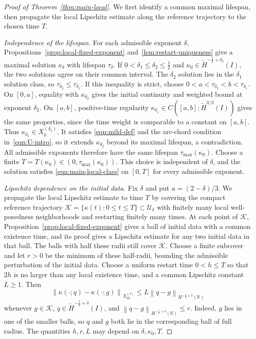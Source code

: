 \documentclass[11pt,reqno]{amsart}
\theoremstyle{plain}
\theoremstyle{definition}
\numberwithin{equation}{section}
\newcommand{\mc}[1]{\mathcal{#1}}
\newcommand{\wt}[1]{\widetilde{#1}}
\newcommand{\norm}[1]{\left\lVert #1 \right\rVert}
\newcommand{\R}{\mathbb{R}}
\newcommand{\thi}[1]{\wt H^{#1}(I)}
\newcommand{\hr}[1]{H^{#1}(\R)}
\begin{document}
\begin{proof}[Proof of Theorem~\ref{thm:main-local}]
We first identify a common maximal lifespan, then propagate the local
Lipschitz estimate along the reference trajectory to the chosen time $T$.

\emph{Independence of the lifespan.}
For each admissible exponent $\delta$,
Propositions~\ref{prop:local-fixed-exponent} and~\ref{lem:restart-uniqueness}
give a maximal solution $\kappa_\delta$ with lifespan $\tau_\delta$.
If $0<\delta_1\le\delta_2\le\frac12$ and
$\kappa_0\in\thi{-\frac12+\delta_2}$, the two solutions agree on their
common interval. The $\delta_2$ solution lies in the
$\delta_1$ solution class, so $\tau_{\delta_2}\le\tau_{\delta_1}$.
If this inequality is strict, choose
$0<a<\tau_{\delta_2}<b<\tau_{\delta_1}$.
On $[0,a]$, equality with $\kappa_{\delta_2}$ gives the initial continuity
and weighted bound at exponent $\delta_2$. On $[a,b]$, positive-time
regularity $\kappa_{\delta_1}\in C([a,b];\thi{3/2})$ gives the same
properties, since the time weight is comparable to a constant on $[a,b]$.
Thus $\kappa_{\delta_1}\in X_b^{(\delta_2)}$. It satisfies
\eqref{eqn:mild-def} and the arc-chord condition in~\eqref{eqn:U-intro},
so it extends $\kappa_{\delta_2}$ beyond its maximal lifespan, a
contradiction. All admissible exponents therefore have the
same lifespan $\tau_{\mathrm{max}}(\kappa_0)$.
Choose a finite $T=T(\kappa_0)\in(0,\tau_{\mathrm{max}}(\kappa_0))$.
This choice is independent of $\delta$, and the solution satisfies
\eqref{eqn:main-local-class} on $[0,T]$ for every admissible exponent.

\emph{Lipschitz dependence on the initial data.}
Fix $\delta$ and put $a=(2-\delta)/3$. We propagate the local Lipschitz
estimate to time $T$ by covering the compact reference trajectory
$\mc K=\{\kappa(t):0\le t\le T\}\subset\mc U_\delta$ with finitely
many local well-posedness neighborhoods and restarting finitely many times.
At each point of $\mc K$, Proposition~\ref{prop:local-fixed-exponent}
gives a ball of initial data with a common existence time, and its proof
gives a Lipschitz estimate for any two initial data in that ball.
The balls with half these radii still cover $\mc K$. Choose a finite
subcover and let $r>0$ be the minimum of these half-radii, bounding
the admissible perturbation of the initial data. Choose a uniform restart time $0<h\le T$
so that $2h$ is no larger than any local existence time, and a common
Lipschitz constant $L\ge1$. Then
\begin{equation}\label{eqn:uniform-local-lipschitz}
    \norm{\kappa(\cdot;q)-\kappa(\cdot;g)}_{X_{2h}^{(\delta)}}
    \le L\norm{q-g}_{\hr{-\frac12+\delta}}
\end{equation}
whenever $g\in\mc K$, $q\in\thi{-\frac12+\delta}$, and
$\norm{q-g}_{\hr{-\frac12+\delta}}\le r$.
Indeed, $g$ lies in one of the smaller balls, so $q$ and $g$ both lie
in the corresponding ball of full radius. The quantities $h,r,L$ may
depend on $\delta,\kappa_0,T$.


\end{proof}
\end{document}
